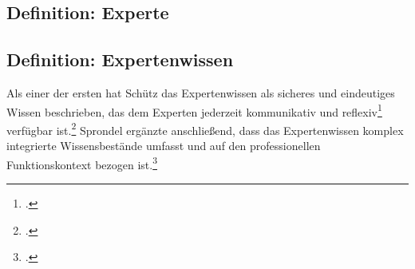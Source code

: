 \subsection{Definition: Experte}
%
%
%
%
%


\subsection{Definition: Expertenwissen}
Als einer der ersten hat Schütz das Expertenwissen als sicheres und eindeutiges Wissen beschrieben, das dem Experten \glqq{}jederzeit kommunikativ und reflexiv\grqq\footcite[][S. 12]{Bogner_2014_Interview} verfügbar ist.\footcite[Vgl.][S. 86 ff. ]{Schuetz_1972}
Sprondel ergänzte anschließend, dass das Expertenwissen komplex integrierte Wissensbestände umfasst und auf den professionellen Funktionskontext bezogen ist.\footcite[Vgl.][S. ]{Sprondel_1979}

